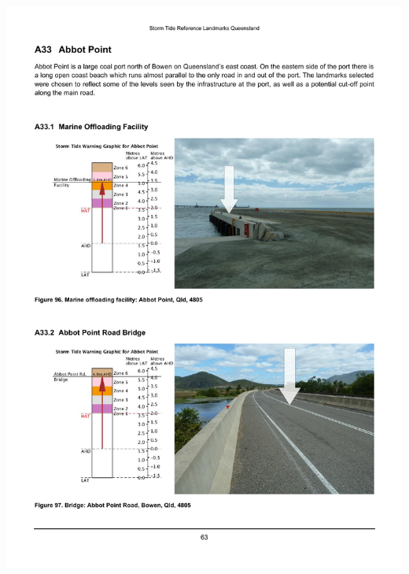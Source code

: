 \begin{frame}
\begin{minipage}{0.6\textwidth}
\end{minipage}
\begin{minipage}{0.3\textwidth}
    \includegraphics[trim={2cm 0 5cm 5cm},clip,height=0.9\textheight]{figures/images/qldLandmarkEg.pdf}
\end{minipage}

\end{frame}


